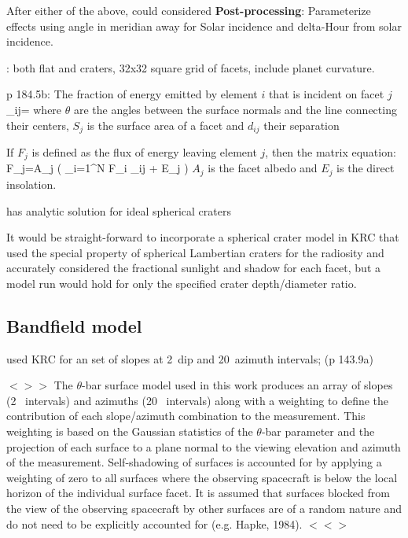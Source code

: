 \documentclass{article}
\newcommand{\bq}{$ < \! > \!   \! >$ } %
\newcommand{\eq}{ $< \! \! < \! > $ } %
\begin{document}
After either of the above, could considered \textbf{Post-processing}:
Parameterize effects using angle in meridian away for Solar incidence and
delta-Hour from solar incidence.

: both flat and craters, 32x32 square grid of facets,
 include planet curvature. 

p 184.5b: The fraction of energy emitted by element $i$ that is incident on
facet $j$ 
\qbn \alpha_{ij}= \qen 
where $\theta$ are the angles between the surface normals and the line
connecting their centers, $S_j$ is the surface area of a facet and $d_{ij}$
their separation

If $F_j$ is defined as the flux of energy leaving element $j$, then the matrix equation:
\qb F_j=A_j \left( \sum_{i=1}^N F_i \alpha_{ij} + E_j \right) \qe
$A_j$ is the facet albedo and $E_j$ is the direct insolation.

 has analytic solution for ideal spherical craters

It would be straight-forward to incorporate a spherical crater model in KRC that
used the special property of spherical Lambertian craters for the radiosity and
accurately considered the fractional sunlight and shadow for each facet, but a
model run would hold for only the specified crater depth/diameter ratio.

\clearpage

\subsection{Bandfield model}

 used KRC for an set of slopes at 2\qd ~dip and 20\qd ~azimuth intervals; (p 143.9a)

\bq The $\theta$-bar surface model used in this work produces an array of slopes
(2\qd~ intervals) and azimuths (20\qd~ intervals) along with a weighting to
define the contribution of each slope/azimuth combination to the
measurement. This weighting is based on the Gaussian statistics of the
$\theta$-bar parameter and the projection of each surface to a plane normal to
the viewing elevation and azimuth of the measurement. Self-shadowing of surfaces
is accounted for by applying a weighting of zero to all surfaces where the
observing spacecraft is below the local horizon of the individual surface
facet. It is assumed that surfaces blocked from the view of the observing
spacecraft by other surfaces are of a random nature and do not need to be
explicitly accounted for (e.g. Hapke, 1984). \eq
\end{document}
